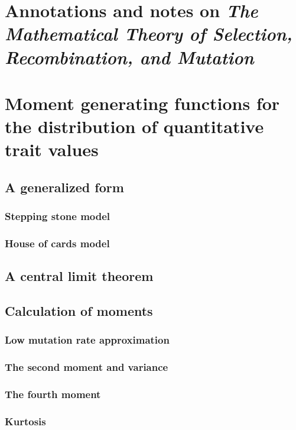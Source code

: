 \documentclass{article}
\begin{document}
\section{Annotations and notes on \emph{The Mathematical Theory of Selection, Recombination, and Mutation} \citep{burger2000mathematical}}
\subsection{\citet[chap. 4]{burger2000mathematical}}

\section{Moment generating functions for the distribution of quantitative trait values}
\subsection{A generalized form}
\subsubsection{Stepping stone model}

\subsubsection{House of cards model}

\subsection{A central limit theorem}

\subsection{Calculation of moments}
\subsubsection{Low mutation rate approximation}

\subsubsection{The second moment and variance}

\subsubsection{The fourth moment}

\subsubsection{Kurtosis}

\end{document}
